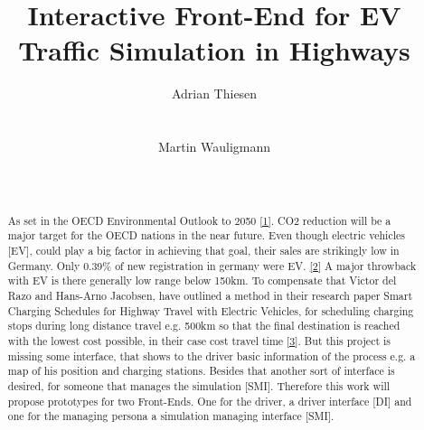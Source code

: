\documentclass{sig-alternate}
\begin{document}
\title{Interactive Front-End for EV Traffic Simulation in Highways}



\author{
\alignauthor Adrian Thiesen\\
       \\
       \\
\alignauthor Martin Wauligmann\\
       \\
       \\
}


\maketitle


\begin{abstract}

As set in the OECD Environmental Outlook to 2050 \href{https://www.oecd.org/env/cc/49082173.pdf}{[1]}. CO2 reduction
will be a major target for the OECD nations in the near future. Even though electric vehicles [EV], could play a big
factor in achieving that goal, their sales are strikingly low in Germany. Only 0.39\% of new registration in germany
were EV. \href{http://www.kba.de/DE/Statistik/Fahrzeuge/Neuzulassungen/neuzulassungen_node.html}{[2]} A major
throwback with EV is there generally low range below 150km. To compensate that Victor del Razo and Hans-Arno
Jacobsen, have outlined a method in their research paper Smart Charging Schedules for Highway Travel with Electric
Vehicles, for scheduling charging stops during long distance travel e.g. 500km  so that the final destination is
reached with the lowest cost possible, in their case cost travel time \href{https://www.i13.in.tum
.de/fileadmin/w00bof/www/PDF/TTE_2016.pdf}{[3}]. But this project is missing some interface, that shows to the driver
basic information of the process e.g. a map of his position and charging stations. Besides that another sort of
interface is desired, for someone that manages the simulation [SMI]. Therefore this work will propose prototypes
for two Front-Ends. One for the driver, a driver interface [DI] and one for the managing persona a simulation
managing interface [SMI].

\end{abstract}
\end{document}
